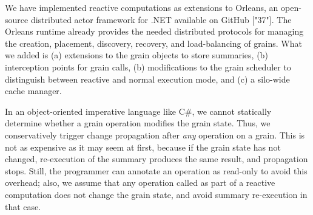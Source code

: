 We have implemented reactive computations as extensions to Orleans, an open-source distributed actor framework for .NET available on GitHub ["37"]. The Orleans runtime already provides the needed distributed protocols for managing the creation, placement, discovery, recovery, and load-balancing of grains. What we added is (a) extensions to the grain objects to store summaries, (b) interception points for grain calls, (b) modifications to the grain scheduler to distinguish between reactive and normal execution mode, and (c) a silo-wide cache manager. 

In an object-oriented imperative language like C\#, we cannot statically determine whether a grain operation modifies the grain state. Thus, we conservatively trigger change propagation after \emph{any} operation on a grain. This is not as expensive as it may seem at first, because if the grain state has not changed, re-execution of the summary produces the same result, and propagation stops. Still, the programmer can annotate an operation as read-only to avoid this overhead; also, we assume that any operation called as part of a reactive computation does not change the grain state, and avoid summary re-execution in that case.


